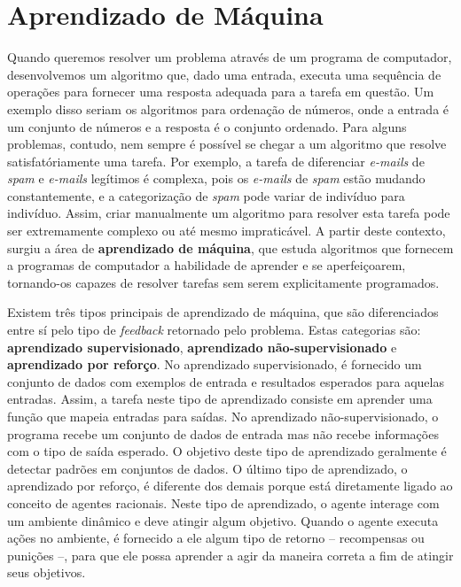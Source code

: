\section{\label{section:machine-learning}Aprendizado de Máquina}
Quando queremos resolver um problema através de um programa de computador,
desenvolvemos um algoritmo que, dado uma entrada, executa uma sequência de
operações para fornecer uma resposta adequada para a tarefa em questão. Um
exemplo disso seriam os algoritmos para ordenação de números, onde a entrada é
um conjunto de números e a resposta é o conjunto ordenado. Para alguns
problemas, contudo, nem sempre é possível se chegar a um algoritmo que resolve
satisfatóriamente uma tarefa. Por exemplo, a tarefa de diferenciar
\textit{e-mails} de \textit{spam} e \textit{e-mails} legítimos é complexa, pois
os \textit{e-mails} de \textit{spam} estão mudando constantemente, e a
categorização de \textit{spam} pode variar de indivíduo para indivíduo. Assim,
criar manualmente um algoritmo para resolver esta tarefa pode ser extremamente
complexo ou até mesmo impraticável. A partir deste contexto, surgiu a área de
\textbf{aprendizado de máquina}, que estuda algoritmos que fornecem a programas
de computador a habilidade de aprender e se aperfeiçoarem, tornando-os capazes
de resolver tarefas sem serem explicitamente programados.

Existem três tipos principais de aprendizado de máquina\cite[cap.
18]{RussellNorvig200912}, que são diferenciados entre sí pelo tipo de
\textit{feedback} retornado pelo problema. Estas categorias são:
\textbf{aprendizado supervisionado}, \textbf{aprendizado não-supervisionado} e
\textbf{aprendizado por reforço}. No aprendizado supervisionado, é fornecido um
conjunto de dados com exemplos de entrada e resultados esperados para aquelas
entradas. Assim, a tarefa neste tipo de aprendizado consiste em aprender uma
função que mapeia entradas para saídas. No aprendizado não-supervisionado, o
programa recebe um conjunto de dados de entrada mas não recebe informações com o
tipo de saída esperado. O objetivo deste tipo de aprendizado geralmente é
detectar padrões em conjuntos de dados.  O último tipo de aprendizado, o
aprendizado por reforço, é diferente dos demais porque está diretamente ligado
ao conceito de agentes racionais.  Neste tipo de aprendizado, o agente interage
com um ambiente dinâmico e deve atingir algum objetivo. Quando o agente executa
ações no ambiente, é fornecido a ele algum tipo de retorno -- recompensas ou
punições --, para que ele possa aprender a agir da maneira correta a fim de
atingir seus objetivos.

